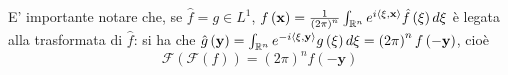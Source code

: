 \documentclass{article}
\begin{document}
E' importante notare che, se $\hat{f}=g\in L^{1}$, $f\left( \mathbf{x}%
\right) =\frac{1}{\left( 2\pi \right) ^{n}}\int_{%
\mathbb{R}
^{n}}e^{i\left\langle \mathbf{\xi ,x}\right\rangle }\hat{f}\left( \mathbf{%
\xi }\right) d\mathbf{\xi }$ \`{e} legata alla trasformata di $\hat{f}$: si
ha che $\hat{g}\left( \mathbf{y}\right) =\int_{%
\mathbb{R}
^{n}}e^{-i\left\langle \mathbf{\xi ,y}\right\rangle }g\left( \mathbf{\xi }%
\right) d\mathbf{\xi }=\left( 2\pi \right) ^{n}f\left( -\mathbf{y}\right) $,
cio\`{e}%
\begin{equation*}
\mathcal{F}\left( \mathcal{F}\left( f\right) \right) =\left( 2\pi \right)
^{n}f\left( -\mathbf{y}\right)
\end{equation*}
\end{document}

